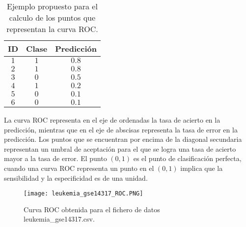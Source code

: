 \bigbreak

\begin{table}[htp]
    \small
    \centering
    \begin{tabular}{c c c}
        ID  & \hspace{10pt}Clase  & \hspace{10pt}Predicción   \\\hline
        $1$ & \hspace{10pt}$1$    & \hspace{10pt}$0.8$        \\\hline
        $2$ & \hspace{10pt}$1$    & \hspace{10pt}$0.8$        \\\hline
        $3$ & \hspace{10pt}$0$    & \hspace{10pt}$0.5$        \\\hline
        $4$ & \hspace{10pt}$1$    & \hspace{10pt}$0.2$        \\\hline
        $5$ & \hspace{10pt}$0$    & \hspace{10pt}$0.1$        \\\hline
        $6$ & \hspace{10pt}$0$    & \hspace{10pt}$0.1$        \\\hline
    \end{tabular}
    \caption{Ejemplo propuesto para el calculo de los puntos que representan la curva ROC.}
    \label{tab:4}
\end{table}

\bigbreak

La curva ROC representa en el eje de ordenadas la tasa de acierto en la predicción, mientras que en el eje de abscisas representa la tasa de error en la predicción. Los puntos que se encuentran por encima de la diagonal secundaria representan un umbral de aceptación para el que se logra una tasa de acierto mayor a la tasa de error. El punto $(0, 1)$ es el punto de clasificación perfecta, cuando una curva ROC representa un punto en el $(0, 1)$ implica que la sensibilidad y la especificidad es de una unidad. 

\bigbreak

\begin{figure}[htp]
    \centering
    \texttt{[image: leukemia\_gse14317\_ROC.PNG]}
    \caption{Curva ROC obtenida para el fichero de datos leukemia\_gse14317.csv.}
    \label{fig:5}
\end{figure}



